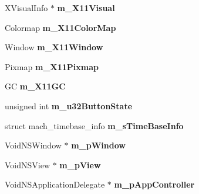 \begin{DoxyCompactItemize}
\item 
\hypertarget{class_p_v_r_shell_init_o_s_afaffbbb23c73014b085b2bb301e6ae60}{X\+Visual\+Info $\ast$ {\bfseries m\+\_\+\+X11\+Visual}}\label{class_p_v_r_shell_init_o_s_afaffbbb23c73014b085b2bb301e6ae60}

\item 
\hypertarget{class_p_v_r_shell_init_o_s_aa03ba5d602ae3c87df57f2cd55326f2a}{Colormap {\bfseries m\+\_\+\+X11\+Color\+Map}}\label{class_p_v_r_shell_init_o_s_aa03ba5d602ae3c87df57f2cd55326f2a}

\item 
\hypertarget{class_p_v_r_shell_init_o_s_a92e9dfb4c92b0e189038e1b2ef6156cf}{Window {\bfseries m\+\_\+\+X11\+Window}}\label{class_p_v_r_shell_init_o_s_a92e9dfb4c92b0e189038e1b2ef6156cf}

\item 
\hypertarget{class_p_v_r_shell_init_o_s_a46372583e3c4b850b3c0e507f72a746b}{Pixmap {\bfseries m\+\_\+\+X11\+Pixmap}}\label{class_p_v_r_shell_init_o_s_a46372583e3c4b850b3c0e507f72a746b}

\item 
\hypertarget{class_p_v_r_shell_init_o_s_a365581c25f54cc77319cf2ce70077538}{G\+C {\bfseries m\+\_\+\+X11\+G\+C}}\label{class_p_v_r_shell_init_o_s_a365581c25f54cc77319cf2ce70077538}

\item 
\hypertarget{class_p_v_r_shell_init_o_s_a8a68c057b88f0c3b79d8fbc62f93ecb7}{unsigned int {\bfseries m\+\_\+u32\+Button\+State}}\label{class_p_v_r_shell_init_o_s_a8a68c057b88f0c3b79d8fbc62f93ecb7}

\item 
\hypertarget{class_p_v_r_shell_init_o_s_a475a3bf46b2e2a8bc6419282c8a36c38}{struct mach\+\_\+timebase\+\_\+info {\bfseries m\+\_\+s\+Time\+Base\+Info}}\label{class_p_v_r_shell_init_o_s_a475a3bf46b2e2a8bc6419282c8a36c38}

\item 
\hypertarget{class_p_v_r_shell_init_o_s_aede50737bb1a4802eb30582b34fcef04}{Void\+N\+S\+Window $\ast$ {\bfseries m\+\_\+p\+Window}}\label{class_p_v_r_shell_init_o_s_aede50737bb1a4802eb30582b34fcef04}

\item 
\hypertarget{class_p_v_r_shell_init_o_s_a0fb57eb5eeebe5a34c275fee7562e61c}{Void\+N\+S\+View $\ast$ {\bfseries m\+\_\+p\+View}}\label{class_p_v_r_shell_init_o_s_a0fb57eb5eeebe5a34c275fee7562e61c}

\item 
\hypertarget{class_p_v_r_shell_init_o_s_a3950a489386c6ffc4a47eee67ba4104a}{Void\+N\+S\+Application\+Delegate $\ast$ {\bfseries m\+\_\+p\+App\+Controller}}\label{class_p_v_r_shell_init_o_s_a3950a489386c6ffc4a47eee67ba4104a}


\end{DoxyCompactItemize}
